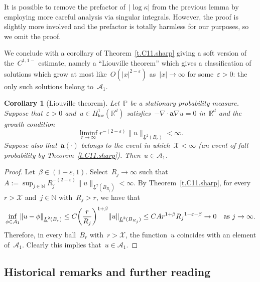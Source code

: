 \documentclass[11pt]{article} %
\numberwithin{equation}{section}
\newtheorem{corollary}[theorem]{Corollary}
\theoremstyle{definition}
\let\originalleft\left
\let\originalright\right
\renewcommand{\left}{\mathopen{}\mathclose\bgroup\originalleft}
\renewcommand{\right}{\aftergroup\egroup\originalright}
\newcommand*{\N}{\ensuremath{\mathbb{N}}}
\newcommand*{\Rd}{\ensuremath{\mathbb{R}^d}}
\newcommand{\eps}{\varepsilon}
\newcommand{\ep}{\eps}
\renewcommand{\a}{\mathbf{a}}
\renewcommand{\P}{\mathbb{P}}
\newcommand{\X}{\mathcal{X}}
\begin{document}
It is possible to remove the prefactor of~$|\log \kappa|$ from the previous lemma by employing more careful analysis via singular integrals. However, the proof is slightly more involved and the prefactor is totally harmless for our purposes, so we omit the proof. 

\smallskip

We conclude with a corollary of Theorem~\ref{t.C11.sharp} giving a soft version of the~$C^{1,1-}$ estimate, namely a ``Liouville theorem'' which gives a classification of solutions which grow at most like~$O(|x|^{2-\ep})$ as~$|x|\to \infty$ for some~$\ep>0$: the only such solutions belong to~$\mathcal{A}_1$. 

\begin{corollary}[Liouville theorem] 
\label{cor.Liouville}
Let~$\P$ be a stationary probability measure. 
Suppose that~$\ep>0$ and~$u\in H^1_{\mathrm{loc}}(\Rd)$ satisfies~$-\nabla \cdot\a\nabla u = 0$ in~$\Rd$ and the growth condition
\begin{equation*}
\liminf_{r \to \infty} 
r^{-(2-\ep)} 
\| u \|_{\underline{L}^2(B_r)} 
< \infty. 
\end{equation*}
Suppose also that~$\a(\cdot)$ belongs to the event in which~$\X < \infty$ (an event of full probability by Theorem~\ref{t.C11.sharp}). 
Then~$u \in\mathcal{A}_1$.
\end{corollary}
\begin{proof}
Let~$\beta \in ( 1-\ep, 1 )$. 
Select~$R_j \to \infty$ such that~$A:= \sup_{j\in\N} R_j^{-(2-\ep)} 
\| u \|_{\underline{L}^2(B_{R_j})} < \infty$. By Theorem~\ref{t.C11.sharp}, for every $r> \X$ and~$j\in\N$ with~$R_j  > r$, we have that 
\begin{equation*}
\inf_{\phi\in \mathcal{A}_1} 
\left\| u - \phi \right\|_{\underline{L}^2(B_r)} 
\leq 
C \left( \frac r {R_j} \right)^{1+\beta} 
\left\| u  \right\|_{\underline{L}^2(B_{R_j})}
\leq 
CA r^{1+\beta} {R_j}^{1-\ep - \beta}
\rightarrow 0 \quad \mbox{as} \ j\to \infty.
\end{equation*}
Therefore, in every ball~$B_r$ with~$r>\X$, the function~$u$ coincides with an element of~$\mathcal{A}_1$. Clearly this implies that~$u\in \mathcal{A}_1$. 
\end{proof}



\subsection*{Historical remarks and further reading}
\end{document}

